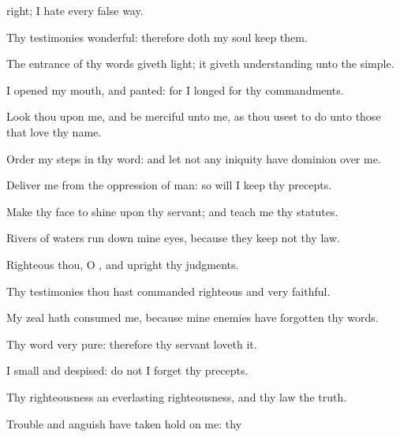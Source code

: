 {{}
right;
{} I
hate every
false
way.
\par }{
\par }{\Q {}Thy
testimonies
{}
wonderful: therefore doth my
soul
keep them.
\par }{\Q {}The
entrance of thy
words giveth
light; it giveth
understanding unto the
simple.
\par }{\Q {}I
opened my
mouth, and
panted: for I
longed for thy
commandments.
\par }{\Q {}Look thou upon me, and be
merciful unto me, as thou
usest to do unto those that
love thy
name.
\par }{\Q {}Order my
steps in thy
word: and let not any
iniquity have
dominion over me.
\par }{\Q {}Deliver me from the
oppression of
man: so will I
keep thy
precepts.
\par }{\Q {}Make thy
face to
shine upon thy
servant; and
teach me thy
statutes.
\par }{\Q {}Rivers of
waters run
down mine
eyes, because they
keep not thy
law.
\par }{\BB \par }{
\par }{\Q {}Righteous
{} thou, O
{}, and
upright
{} thy
judgments.
\par }{\Q {}Thy
testimonies
{} thou hast
commanded
{}
righteous and
very
faithful.
\par }{\Q {}My
zeal hath
consumed me, because mine
enemies have
forgotten thy
words.
\par }{\Q {}Thy
word
{}
very
pure: therefore thy
servant
loveth it.
\par }{\Q {}I
{}
small and
despised:
{} do not I
forget thy
precepts.
\par }{\Q {}Thy
righteousness
{} an
everlasting
righteousness, and thy
law
{} the
truth.
\par }{\BB \par }{\Q {}Trouble and
anguish have taken
hold on me:
{} thy
}
